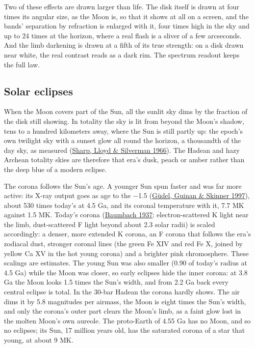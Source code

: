 \documentclass[9pt,twocolumn]{extarticle}
\begin{document}
Two of these effects are drawn larger than life. The disk itself is drawn at four times its angular size, as the Moon is, so that it shows at all on a screen, and the bands' separation by refraction is enlarged with it, four times high in the sky and up to 24 times at the horizon, where a real flash is a sliver of a few arcseconds. And the limb darkening is drawn at a fifth of its true strength: on a disk drawn near white, the real contrast reads as a dark rim. The spectrum readout keeps the full law.


\subsection{Solar eclipses}\label{solar-eclipses}

When the Moon covers part of the Sun, all the sunlit sky dims by the fraction of the disk still showing. In totality the sky is lit from beyond the Moon's shadow, tens to a hundred kilometers away, where the Sun is still partly up: the epoch's own twilight sky with a sunset glow all round the horizon, a thousandth of the day sky, as measured (\protect\hyperlink{cite.sharp1966}{Sharp, Lloyd \& Silverman 1966}). The Hadean and hazy Archean totality skies are therefore that era's dusk, peach or amber rather than the deep blue of a modern eclipse.

The corona follows the Sun's age. A younger Sun spun faster and was far more active: its X-ray output goes as age to the $-$1.5 (\protect\hyperlink{cite.gudel1997}{Güdel, Guinan \& Skinner 1997}), about 530 times today's at 4.5 Ga, and its coronal temperature with it, 7.7 MK against 1.5 MK. Today's corona (\protect\hyperlink{cite.baumbach1937}{Baumbach 1937}: electron-scattered K light near the limb, dust-scattered F light beyond about 2.3 solar radii) is scaled accordingly: a denser, more extended K corona, an F corona that follows the era's zodiacal dust, stronger coronal lines (the green Fe XIV and red Fe X, joined by yellow Ca XV in the hot young corona) and a brighter pink chromosphere. These scalings are estimates. The young Sun was also smaller (0.90 of today's radius at 4.5 Ga) while the Moon was closer, so early eclipses hide the inner corona: at 3.8 Ga the Moon looks 1.5 times the Sun's width, and from 2.2 Ga back every central eclipse is total. In the 30-bar Hadean the corona hardly shows. The air dims it by 5.8 magnitudes per airmass, the Moon is eight times the Sun's width, and only the corona's outer part clears the Moon's limb, as a faint glow lost in the molten Moon's own aureole. The proto-Earth of 4.55 Ga has no Moon, and so no eclipses; its Sun, 17 million years old, has the saturated corona of a star that young, at about 9 MK.
\end{document}
